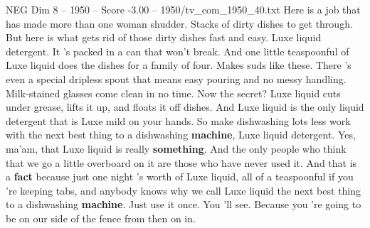 \begin{textsample}{NEG Dim 8 – 1950 – Score -3.00 – 1950/tv\_com\_1950\_40.txt}  \label{ex:f8_neg_083}
Here is a job that has made more than one woman shudder.
Stacks of dirty dishes to get through.
But here is what gets rid of those dirty dishes fast and easy.
Luxe liquid detergent.
It 's packed in a can that won't break.
And one little teaspoonful of Luxe liquid does the dishes for a family of four.
Makes suds like these.
There 's even a special dripless spout that means easy pouring and no messy handling.
Milk-stained glasses come clean in no time.
Now the secret?
Luxe liquid cuts under grease, lifts it up, and floats it off dishes.
And Luxe liquid is the only liquid detergent that is Luxe mild on your hands.
So make dishwashing lots less work with the next best thing to a dishwashing \textbf{machine}, Luxe liquid detergent.
Yes, ma'am, that Luxe liquid is really \textbf{something}.
And the only people who think that we go a little overboard on it are those who have never used it.
And that is a \textbf{fact} because just one night 's worth of Luxe liquid, all of a teaspoonful if you 're keeping tabs, and anybody knows why we call Luxe liquid the next best thing to a dishwashing \textbf{machine}.
Just use it once.
You 'll see.
Because you 're going to be on our side of the fence from then on in.

\end{textsample}
